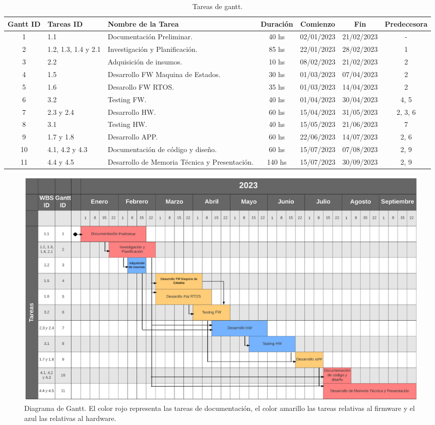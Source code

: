 \documentclass[
11pt, %
]{charter}
\begin{document}
\begin{table}[htpb]
\centering
\begin{tabularx}{\linewidth}{@{}|c|X|X|c|c|c|c|@{}}
\hline
\rowcolor[HTML]{C0C0C0} 
Gantt ID & Tareas ID & Nombre de la Tarea & Duración & Comienzo & Fin & Predecesora \\ \hline
1&1.1&Documentación Preliminar.&40 hs&02/01/2023&21/02/2023&-\\ \hline
2&1.2, 1.3, 1.4 y 2.1&Investigación y Planificación.&85 hs&22/01/2023&28/02/2023&1\\ \hline
3&2.2&Adquisición de insumos.&10 hs&08/02/2023&21/02/2023&2\\ \hline
4&1.5&Desarrollo FW Maquina de Estados.&30 hs&01/03/2023&07/04/2023&2\\ \hline
5&1.6&Desarollo FW RTOS.&35 hs&01/03/2023&14/04/2023&2\\ \hline
6&3.2&Testing FW.&40 hs&01/04/2023&30/04/2023&4, 5\\ \hline
7&2.3 y 2.4&Desarrollo HW.&60 hs&15/04/2023&31/05/2023&2, 3, 6\\ \hline
8&3.1&Testing HW.&40 hs&15/05/2023&21/06/2023&7\\ \hline
9&1.7 y 1.8&Desarrollo APP.&60 hs&22/06/2023&14/07/2023&2, 6\\ \hline
10&4.1, 4.2 y 4.3&Documentación de código y diseño.&60 hs&15/07/2023&07/08/2023&2, 9\\ \hline
11&4.4 y 4.5&Desarrollo de Memoria Técnica y Presentación.&140 hs&15/07/2023&30/09/2023&2, 9\\ \hline
\end{tabularx}%
\caption{Tareas de gantt.}
\label{tab:tabGantt}
\end{table}

\begin{landscape}
\begin{figure}[htpb]
\centering 
\includegraphics[height=.85\textheight]{./Figuras/diagGantt.png}
\caption{Diagrama de Gantt. El color rojo representa las tareas de documentación, el color amarillo las tareas relativas al firmware y el azul las relativas al hardware.}
\label{fig:diagGantt}
\end{figure}

\end{landscape}
\end{document}
